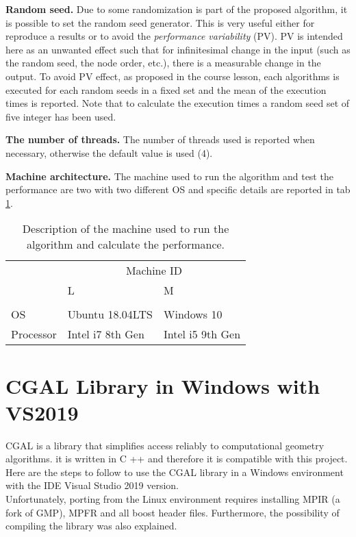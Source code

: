 \documentclass[10pt, english, openany]{report}
\begin{document}
\begin{appendices}
			\textbf{Random seed.} Due to some randomization is part of the proposed algorithm, it is possible to set the random seed generator. This is very useful either for reproduce a results or to avoid the \textit{performance variability} (PV). PV is intended here as an unwanted effect such that for infinitesimal change in the input (such as the random seed, the node order, etc.), there is a measurable change in the output. To avoid PV effect, as proposed in the course lesson, each algorithms is executed for each random seeds in a fixed set and the mean of the execution times is reported. Note that to calculate the execution times a random seed set of five integer has been used.
			
			\textbf{The number of threads.} The number of threads used is reported when necessary, otherwise the default value is used (4).
			
			\textbf{Machine architecture.} The machine used to run the algorithm and test the performance are two with two different OS and specific details are reported in tab \ref{tab:machines}.
			\begin{table}[h]
				\begin{center}
					\caption{Description of the machine used to run the algorithm and calculate the performance.}
					\label{tab:machines}
					\begin{tabular}{lll}
									&   \multicolumn{2}{c}{Machine ID} 	\\
						 			& L 				&	 M 			\\ \hline \\
						OS 			& Ubuntu 18.04LTS 	& Windows 10 	\\
						Processor	& Intel i7 8th Gen	&	Intel i5 9th Gen		\\
					\end{tabular}
				\end{center}
			\end{table}

		\chapter{CGAL Library in Windows with VS2019} \label{sec:cagalOne}
CGAL is a library that simplifies access reliably to computational geometry algorithms. it is written in C ++ and therefore it is compatible with this project. Here are the steps to follow to use the CGAL library in a Windows environment with the IDE Visual Studio 2019 version.\\ Unfortunately, porting from the Linux environment requires installing MPIR (a fork of GMP), MPFR and all boost header files. Furthermore, the possibility of compiling the library was also explained.

\end{appendices}
\end{document}
